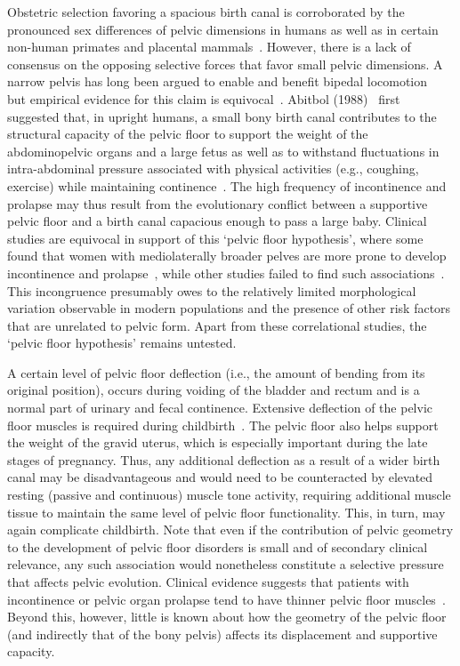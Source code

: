 \documentclass[9pt,twocolumn,twoside]{pnas-new}
\begin{document}
Obstetric selection favoring a spacious birth canal is corroborated by the pronounced sex differences of pelvic dimensions in humans as well as in certain non-human primates and placental mammals~\cite{Grunstra2019-wq,Tague2005-os,Fischer2015-tu,Moffett2017-xv,DelPrete2019-ff}. However, there is a lack of consensus on the opposing selective forces that favor small pelvic dimensions. A narrow pelvis has long been argued to enable and benefit bipedal locomotion~\cite{Washburn1960-gm,Ruff1995-mz,Rosenberg2005-tl} but empirical evidence for this claim is equivocal~\cite{Gruss2017-bn,Warrener2015-tt,Whitcome2017-gh}. Abitbol (1988)~\cite{Abitbol1988-ir} first suggested that, in upright humans, a small bony birth canal contributes to the structural capacity of the pelvic floor to support the weight of the abdominopelvic organs and a large fetus as well as to withstand fluctuations in intra-abdominal pressure associated with physical activities (e.g., coughing, exercise) while maintaining continence~\cite{Brown2013-pi,Grunstra2019-wq,Pavlicev2020-zl}. The high frequency of incontinence and prolapse may thus result from the evolutionary conflict between a supportive pelvic floor and a birth canal capacious enough to pass a large baby. Clinical studies are equivocal in support of this `pelvic floor hypothesis’, where some found that women with mediolaterally broader pelves are more prone to develop incontinence and prolapse~\cite{Brown2013-pi,Sze1999-tb,Handa2003-fp}, while other studies failed to find such associations~\cite{Li2015-vk,Stein2009-fq,Handa2009-ri}. This incongruence presumably owes to the relatively limited morphological variation observable in modern populations and the presence of other risk factors that are unrelated to pelvic form. Apart from these correlational studies, the `pelvic floor hypothesis’ remains untested.

A certain level of pelvic floor deflection (i.e., the amount of bending from its original position), occurs during voiding of the bladder and rectum and is a normal part of urinary and fecal continence. Extensive deflection of the pelvic floor muscles is required during childbirth~\cite{Bitti2014-tv,Fernandez2015-rb,Schawkat2018-et,El_Sayed2017-sy}. The pelvic floor also helps support the weight of the gravid uterus, which is especially important during the late stages of pregnancy. Thus, any additional deflection as a result of a wider birth canal may be disadvantageous and would need to be counteracted by elevated resting (passive and continuous) muscle tone activity, requiring additional muscle tissue to maintain the same level of pelvic floor functionality. This, in turn, may again complicate childbirth. Note that even if the contribution of pelvic geometry to the development of pelvic floor disorders is small and of secondary clinical relevance, any such association would nonetheless constitute a selective pressure that affects pelvic evolution. Clinical evidence suggests that patients with incontinence or pelvic organ prolapse tend to have thinner pelvic floor muscles~\cite{Bitti2014-tv,El_Sayed2017-sy,Morkved2004-bi,Hoyte2004-qr}. Beyond this, however, little is known about how the geometry of the pelvic floor (and indirectly that of the bony pelvis) affects its displacement and supportive capacity.	
\end{document}
